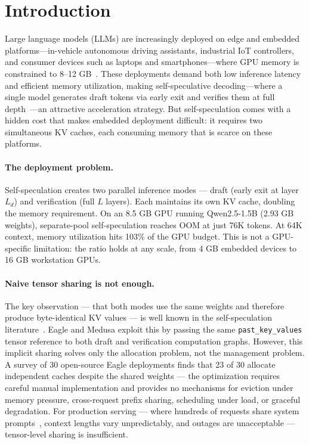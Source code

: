 \documentclass[review]{elsarticle}
\theoremstyle{definition}
\theoremstyle{remark}
\begin{document}
\section{Introduction}

Large language models (LLMs) are increasingly deployed on edge and embedded
platforms---in-vehicle autonomous driving assistants, industrial IoT controllers,
and consumer devices such as laptops and smartphones---where GPU memory is
constrained to 8--12 GB~\cite{edge-survey}. These deployments demand both low
inference latency and efficient memory utilization, making self-speculative
decoding---where a single model generates draft tokens via early exit and
verifies them at full depth~\cite{eagle2024,staged-spec}---an attractive
acceleration strategy. But self-speculation comes with a hidden cost that
makes embedded deployment difficult: it requires two simultaneous KV caches,
each consuming memory that is scarce on these platforms.

\paragraph{The deployment problem.}
Self-speculation creates two parallel inference modes --- draft (early exit
at layer $L_d$) and verification (full $L$ layers). Each maintains its own
KV cache, doubling the memory requirement. On an 8.5 GB GPU running
Qwen2.5-1.5B (2.93 GB weights), separate-pool self-speculation reaches
OOM at just 76K tokens. At 64K context, memory utilization hits 103\%
of the GPU budget. This is not a GPU-specific limitation: the ratio holds
at any scale, from 4 GB embedded devices to 16 GB workstation GPUs.

\paragraph{Naive tensor sharing is not enough.}
The key observation --- that both modes use the same weights and therefore
produce byte-identical KV values --- is well known in the self-speculation
literature~\cite{eagle2024,medusa2024}. Eagle and Medusa exploit this by
passing the same \texttt{past\_key\_values} tensor reference to both draft
and verification computation graphs. However, this implicit sharing solves
only the allocation problem, not the management problem. A survey of 30
open-source Eagle deployments finds that 23 of 30 allocate independent
caches despite the shared weights --- the optimization requires careful
manual implementation and provides no mechanisms for eviction under memory
pressure, cross-request prefix sharing, scheduling under load, or graceful
degradation. For production serving --- where hundreds of requests share
system prompts~\cite{sharegpt}, context lengths vary unpredictably, and
outages are unacceptable --- tensor-level sharing is insufficient.
\end{document}
